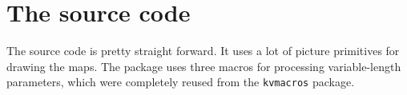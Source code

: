 \documentclass[a4paper,10pt]{ltxdoc}
\newcommand\Package[1]{\texttt{#1}}
\begin{document}
\newpage
\section{The source code}
\label{sec:sourcecode}
The source code is pretty straight forward. It uses a lot of picture primitives
for drawing the maps. The package uses three macros for processing
variable-length parameters, which were completely reused from the
\Package{kvmacros} package.


\end{document}
